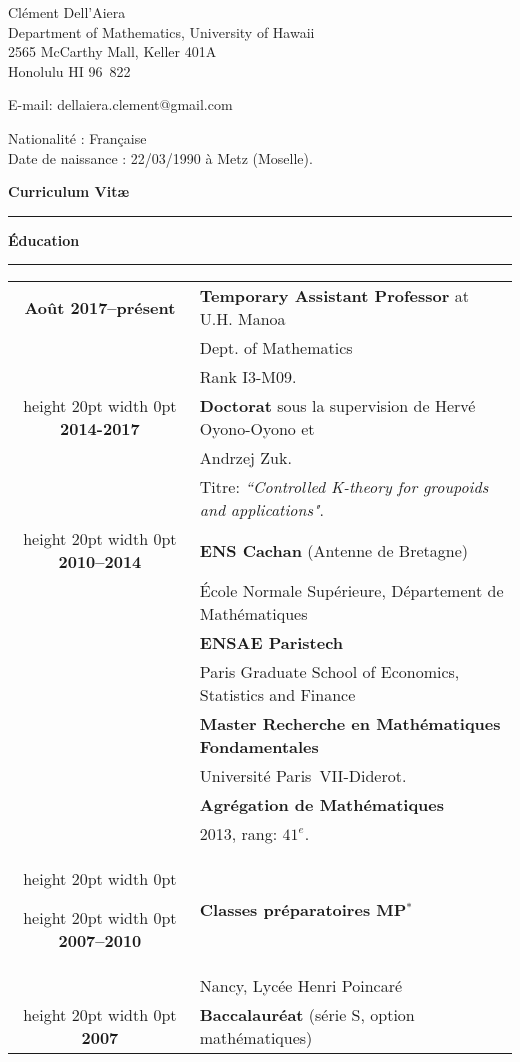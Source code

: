 \documentclass[a4paper,11pt]{article}
\newcommand\espace{\vrule height 20pt width 0pt}
\newcommand{\titre}[1]{%
	\begin{center}
	\bigskip
	\rule{\textwidth}{1pt}
	\par\vspace{0.1cm}
        \textbf{\large #1}
	\par\rule{\textwidth}{1pt}
	\end{center}
	\bigskip
	}
\begin{document}
\begin{flushleft}
Clément Dell'Aiera \\
Department of Mathematics, University of Hawaii\\
2565 McCarthy Mall, Keller 401A \\
Honolulu HI 96\ 822 \\

\medskip

E-mail: dellaiera.clement@gmail.com


\end{flushleft}
\begin{flushleft}
Nationalit\'e : Fran\c{c}aise \\
Date de naissance : 22/03/1990 \`a Metz (Moselle).
\end{flushleft}

\vspace{1.5cm}
\begin{center}
\par\huge{\textbf{Curriculum Vit\ae} }
\end{center}

\titre{\'Education}

\begin{tabular}{cp{}}

\textbf{Ao\^{u}t 2017--pr\'esent} &  \textbf{Temporary Assistant Professor} at U.H. Manoa \\
						& Dept. of Mathematics\\
						& Rank I3-M09. \\ 
\espace
\textbf{2014-2017} &  \textbf{Doctorat} sous la supervision de Hervé  Oyono-Oyono et\\ 
						& Andrzej Zuk.\\
						& Titre: \textit{``Controlled K-theory for groupoids and applications"}. \\
\espace
\textbf{2010--2014} &  \textbf{ENS Cachan} (Antenne de Bretagne) \\
				    & 	\'Ecole Normale Supérieure, D\'epartement de Math\'ematiques \\
                              & \textbf{ENSAE Paristech}\\
				   & Paris Graduate School of Economics, Statistics and Finance\\
                                   & \textbf{Master Recherche en Math\'ematiques Fondamentales}\\  & Universit\'e Paris~VII-Diderot. \\
                                   & \textbf{Agrégation de Mathématiques} \\
				& 2013, rang: $41^e$. \\
\espace

\espace
\textbf{2007--2010} &\textbf{Classes préparatoires MP$^*$ } \\
					& Nancy, Lycée Henri Poincaré\\

\espace
\textbf{2007} & \textbf{Baccalauréat} (série S, option math\'ematiques) 
 \\

\end{tabular}
\end{document}
